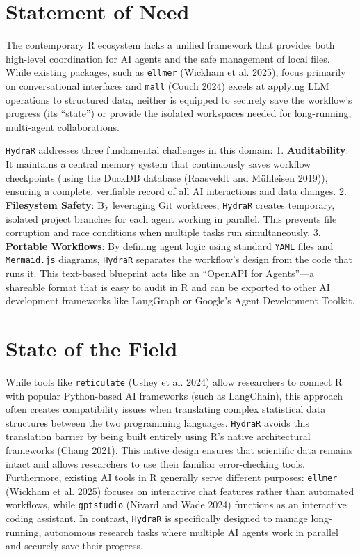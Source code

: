 \documentclass[10pt,a4paper,onecolumn]{article}
\begin{document}
\section{Statement of Need}\label{statement-of-need}

The contemporary R ecosystem lacks a unified framework that provides both high-level coordination for AI agents and the safe management of local files. While existing packages, such as \texttt{ellmer} (Wickham et al. 2025), focus primarily on conversational interfaces and \texttt{mall} (Couch 2024) excels at applying LLM operations to structured data, neither is equipped to securely save the workflow's progress (its ``state'') or provide the isolated workspaces needed for long-running, multi-agent collaborations.

\texttt{HydraR} addresses three fundamental challenges in this domain:
1. \textbf{Auditability}: It maintains a central memory system that continuously saves workflow checkpoints (using the DuckDB database (Raasveldt and Mühleisen 2019)), ensuring a complete, verifiable record of all AI interactions and data changes. 2. \textbf{Filesystem Safety}: By leveraging Git worktrees, \texttt{HydraR} creates temporary, isolated project branches for each agent working in parallel. This prevents file corruption and race conditions when multiple tasks run simultaneously. 3. \textbf{Portable Workflows}: By defining agent logic using standard \texttt{YAML} files and \texttt{Mermaid.js} diagrams, \texttt{HydraR} separates the workflow's design from the code that runs it. This text-based blueprint acts like an ``OpenAPI for Agents''---a shareable format that is easy to audit in R and can be exported to other AI development frameworks like LangGraph or Google's Agent Development Toolkit.

\section{State of the Field}\label{state-of-the-field}

While tools like \texttt{reticulate} (Ushey et al. 2024) allow researchers to connect R with popular Python-based AI frameworks (such as LangChain), this approach often creates compatibility issues when translating complex statistical data structures between the two programming languages. \texttt{HydraR} avoids this translation barrier by being built entirely using R's native architectural frameworks (Chang 2021). This native design ensures that scientific data remains intact and allows researchers to use their familiar error-checking tools. Furthermore, existing AI tools in R generally serve different purposes: \texttt{ellmer} (Wickham et al. 2025) focuses on interactive chat features rather than automated workflows, while \texttt{gptstudio} (Nivard and Wade 2024) functions as an interactive coding assistant. In contrast, \texttt{HydraR} is specifically designed to manage long-running, autonomous research tasks where multiple AI agents work in parallel and securely save their progress.
\end{document}
